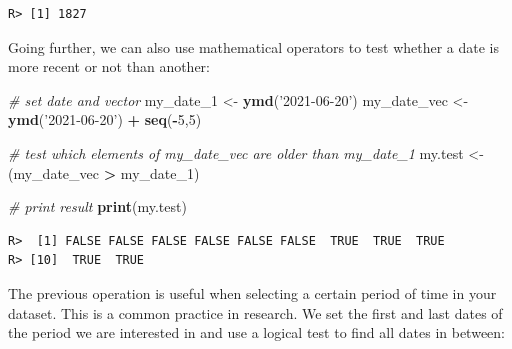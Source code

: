 \documentclass[
  12pt,
]{book}
\newenvironment{Shaded}{\begin{snugshade}}{\end{snugshade}}
\newcommand{\CommentTok}[1]{\textcolor[rgb]{0.37,0.37,0.37}{\textit{#1}}}
\newcommand{\DecValTok}[1]{\textcolor[rgb]{0.06,0.06,0.06}{#1}}
\newcommand{\KeywordTok}[1]{\textcolor[rgb]{0.27,0.27,0.27}{\textbf{#1}}}
\newcommand{\NormalTok}[1]{#1}
\newcommand{\OperatorTok}[1]{\textcolor[rgb]{0.43,0.43,0.43}{\textbf{#1}}}
\newcommand{\StringTok}[1]{\textcolor[rgb]{0.5,0.5,0.5}{#1}}
\begin{document}
\begin{verbatim}
R> [1] 1827
\end{verbatim}

Going further, we can also use mathematical operators to test whether a date is more recent or not than another:

\begin{Shaded}
\begin{Highlighting}[]
\CommentTok{# set date and vector}
\NormalTok{my_date_}\DecValTok{1}\NormalTok{ <-}\StringTok{ }\KeywordTok{ymd}\NormalTok{(}\StringTok{'2021-06-20'}\NormalTok{)}
\NormalTok{my_date_vec <-}\StringTok{ }\KeywordTok{ymd}\NormalTok{(}\StringTok{'2021-06-20'}\NormalTok{) }\OperatorTok{+}\StringTok{ }\KeywordTok{seq}\NormalTok{(}\OperatorTok{-}\DecValTok{5}\NormalTok{,}\DecValTok{5}\NormalTok{)}

\CommentTok{# test which elements of my_date_vec are older than my_date_1}
\NormalTok{my.test <-}\StringTok{ }\NormalTok{(my_date_vec }\OperatorTok{>}\StringTok{ }\NormalTok{my_date_}\DecValTok{1}\NormalTok{)}

\CommentTok{# print result}
\KeywordTok{print}\NormalTok{(my.test)}
\end{Highlighting}
\end{Shaded}

\begin{verbatim}
R>  [1] FALSE FALSE FALSE FALSE FALSE FALSE  TRUE  TRUE  TRUE
R> [10]  TRUE  TRUE
\end{verbatim}

The previous operation is useful when selecting a certain period of time in your dataset. This is a common practice in research. We set the first and last dates of the period we are interested in and use a logical test to find all dates in between:
\end{document}
